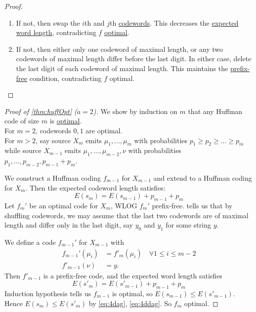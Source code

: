 \documentclass{article}
\begin{document}
\begin{proof}
    \leavevmode
    \begin{enumerate}[label=\roman*)]
        \item If not, then swap the $i$th and $j$th \hyperlink{def:codewords}{codewords}.
            This decreases the \hyperlink{def:ewl}{expected word length}, contradicting $f$ \hyperlink{def:optCode}{optimal}.
        \item If not, then either only one codeword of maximal length, or any two codewords of maximal length differ before the last digit.
            In either case, delete the last digit of each codeword of maximal length.
            This maintains the \hyperlink{def:prefixFreeCode}{prefix-free} condition, contradicting $f$ optimal.
    \end{enumerate}
\end{proof}
\begin{proof}[Proof of \cref{thm:huffOpt} ($a=2$)]
    We show by induction on $m$ that any Huffman code of size $m$ is \hyperlink{def:optCode}{optimal}. \\
    For $m=2$, codewords $0,1$ are optimal. \\
    For $m>2$, say source $X_m$ emits $\mu_1, \dotsc, \mu_m$ with probabilities $p_1 \geq p_2 \geq \dotsc \geq p_m$ while source $X_{m-1}$ emits $\mu_1, \dotsc, \mu_{m-2}, \nu$ with probabilities $p_1, \dotsc, p_{m-2}, p_{m-1} + p_m$.

    We construct a Huffman coding $f_{m-1}$ for $X_{m-1}$ and extend to a Huffman coding for $X_m$.
    Then the expected codeword length satisfies:
    \begin{equation*}
        E(s_m) = E(s_{m-1}) + p_{m-1} + p_m \label{eq:4dag} \tag{$\dagger$}
    \end{equation*}
    Let $f_m'$ be an optimal code for $X_m$, WLOG $f_m'$ prefix-free.
     tells us that by shuffling codewords, we may assume that the last two codewords are of maximal length and differ only in the last digit, say $y_0$ and $y_1$ for some string $y$.

    We define a code $f_{m-1}'$ for $X_{m-1}$ with
    \begin{align*}
        f_{m-1}'(\mu_i) &= f'_m(\mu_i) \quad \forall 1 \leq i \leq m-2 \\
        f'_{m-1}(\nu) &= y.
    \end{align*}
    Then $f'_{m-1}$ is a prefix-free code, and the expected word length satisfies
    \begin{equation*}
        E(s'_m) = E(s'_{m-1}) + p_{m-1} + p_m \tag{$\ddagger$} \label{eq:4ddag}
    \end{equation*}
    Induction hypothesis tells us $f_{m-1}$ is optimal, so $E(s_{m-1}) \leq E(s'_{m-1})$. Hence $E(s_m) \leq E(s'_m)$ by \eqref{eq:4dag}, \eqref{eq:4ddag}.
    So $f_m$ optimal.
\end{proof}
\end{document}
